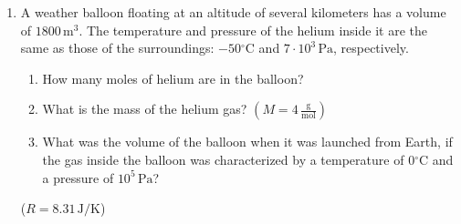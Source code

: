 \documentclass[12pt]{letter}
\begin{document}
\begin{enumerate}
\begin{center}
\end{center}

The aluminum ring must expand from
$$D_0=11.27\,\mathrm{cm}=0.1127\,\mathrm{m}$$
to
$$D=11.30\,\mathrm{cm}=0.113\,\mathrm{m}.$$

The linear thermal expansion formula is
$$D=D_0(1+\alpha\Delta T).$$

Thus,
$$\Delta T=\frac{D-D_0}{\alpha D_0}.$$

Substitution gives
$$\Delta T=\frac{0.113\,\mathrm{m}-0.1127\,\mathrm{m}}{(2.87\cdot 10^{-5}\,\mathrm{1/K})\cdot 0.1127\,\mathrm{m}}\approx 92.75\,\mathrm{K}.$$

The initial temperature is
$$T_0=30^\circ\mathrm{C}.$$

Therefore,
$$T=T_0+\Delta T=30^\circ\mathrm{C}+92.75^\circ\mathrm{C}\approx \boxed{122.75^\circ\mathrm{C}.}$$

\hfill (10~points)


\pagebreak
\item A weather balloon floating at an altitude of several kilometers has a volume of $1800\,\mathrm{m}^{3}$. The temperature and pressure of the helium inside it are the same as those of the surroundings: $-50{}^{\circ}\mathrm{C}$ and $7 \cdot 10^{3}\,\mathrm{Pa}$, respectively.
\begin{enumerate}
\item How many moles of helium are in the balloon?
\item What is the mass of the helium gas? $\left(M = 4\,\frac{\mathrm{g}}{\mathrm{mol}}\right)$
\item What was the volume of the balloon when it was launched from Earth, if the gas inside the balloon was characterized by a temperature of $0{}^{\circ}\mathrm{C}$ and a pressure of $10^{5}\,\mathrm{Pa}$?
\end{enumerate}
($R=8.31\,\mathrm{J/K}$) 


\end{enumerate}
\end{document}
